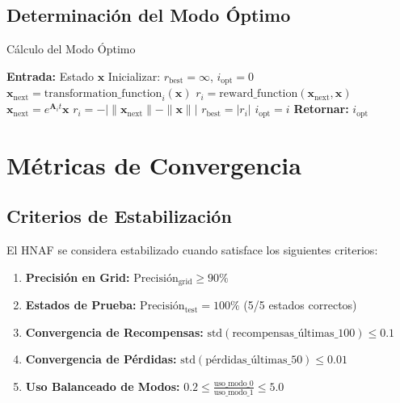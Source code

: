 \documentclass[12pt,a4paper]{article}
\begin{document}
\subsection{Determinación del Modo Óptimo}

\begin{algorithm}
\caption{Cálculo del Modo Óptimo}
\begin{algorithmic}[1]
\STATE \textbf{Entrada:} Estado $\mathbf{x}$
\STATE Inicializar: $r_{\text{best}} = \infty$, $i_{\text{opt}} = 0$
        \STATE $\mathbf{x}_{\text{next}} = \text{transformation\_function}_i(\mathbf{x})$
        \STATE $r_i = \text{reward\_function}(\mathbf{x}_{\text{next}}, \mathbf{x})$
    \ELSE
        \STATE $\mathbf{x}_{\text{next}} = e^{\mathbf{A}_i t} \mathbf{x}$
        \STATE $r_i = -|\|\mathbf{x}_{\text{next}}\| - \|\mathbf{x}\||$
    \ENDIF
        \STATE $r_{\text{best}} = |r_i|$
        \STATE $i_{\text{opt}} = i$
    \ENDIF
\ENDFOR
\STATE \textbf{Retornar:} $i_{\text{opt}}$
\end{algorithmic}
\end{algorithm}

\section{Métricas de Convergencia}

\subsection{Criterios de Estabilización}

El HNAF se considera estabilizado cuando satisface los siguientes criterios:

\begin{enumerate}
\item \textbf{Precisión en Grid:} $\text{Precisión}_{\text{grid}} \geq 90\%$
\item \textbf{Estados de Prueba:} $\text{Precisión}_{\text{test}} = 100\%$ (5/5 estados correctos)
\item \textbf{Convergencia de Recompensas:} $\text{std}(\text{recompensas\_últimas\_100}) \leq 0.1$
\item \textbf{Convergencia de Pérdidas:} $\text{std}(\text{pérdidas\_últimas\_50}) \leq 0.01$
\item \textbf{Uso Balanceado de Modos:} $0.2 \leq \frac{\text{uso\_modo\_0}}{\text{uso\_modo\_1}} \leq 5.0$
\end{enumerate}
\end{document}
